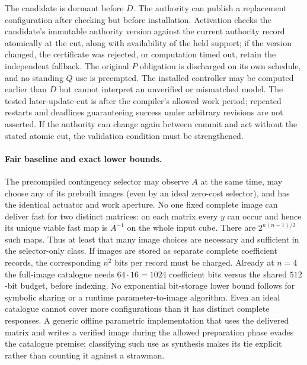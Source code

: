 \documentclass[11pt]{article}
\begin{document}
The candidate is dormant before $D$. The authority can publish a replacement configuration after checking but before installation. Activation checks the candidate's immutable authority version against the current authority record atomically at the cut, along with availability of the held support; if the version changed, the certificate was rejected, or computation timed out, retain the independent fallback. The original $P$ obligation is discharged on its own schedule, and no standing $Q$ use is preempted. The installed controller may be computed earlier than $D$ but cannot interpret an unverified or mismatched model. The tested later-update cut is after the compiler's allowed work period; repeated restarts and deadlines guaranteeing success under arbitrary revisions are not asserted. If the authority can change again between commit and act without the stated atomic cut, the validation condition must be strengthened.

\paragraph{Fair baseline and exact lower bounds.}
The precompiled contingency selector may observe $A$ at the same time, may choose any of its prebuilt images (even by an ideal zero-cost selector), and has the identical actuator and work aperture. No one fixed complete image can deliver fast for two distinct matrices: on each matrix every $y$ can occur and hence its unique viable fast map is $A^{-1}$ on the whole input cube. There are $2^{n(n-1)/2}$ such maps. Thus at least that many image choices are necessary and sufficient in the selector-only class. If images are stored as separate complete coefficient records, the corresponding $n^2$ bits per record must be charged. Already at $n=4$ the full-image catalogue needs $64\cdot16=1024$ coefficient bits versus the shared $512$-bit budget, before indexing. No exponential bit-storage lower bound follows for symbolic sharing or a runtime parameter-to-image algorithm. Even an ideal catalogue cannot cover more configurations than it has distinct complete responses. A generic offline parametric implementation that uses the delivered matrix and writes a verified image during the allowed preparation phase evades the catalogue premise; classifying such use as synthesis makes its tie explicit rather than counting it against a strawman.
\end{document}
